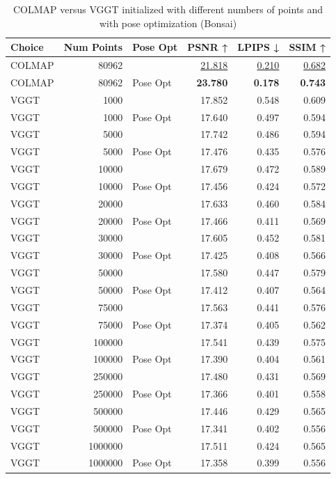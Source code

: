 \begin{table}[H]
\caption{COLMAP versus VGGT initialized with different numbers of points and with pose optimization (Bonsai)}
\label{tab:02_num_points_pose_opt_bonsai}
\begin{tabular}{lrlrrr}
\toprule
Choice & Num Points & Pose Opt & PSNR ↑ & LPIPS ↓ & SSIM ↑ \\
\midrule
COLMAP & 80962 &  & \underline{21.818} & \underline{0.210} & \underline{0.682} \\
COLMAP & 80962 & Pose Opt & \textbf{23.780} & \textbf{0.178} & \textbf{0.743} \\
VGGT & 1000 &  & 17.852 & 0.548 & 0.609 \\
VGGT & 1000 & Pose Opt & 17.640 & 0.497 & 0.594 \\
VGGT & 5000 &  & 17.742 & 0.486 & 0.594 \\
VGGT & 5000 & Pose Opt & 17.476 & 0.435 & 0.576 \\
VGGT & 10000 &  & 17.679 & 0.472 & 0.589 \\
VGGT & 10000 & Pose Opt & 17.456 & 0.424 & 0.572 \\
VGGT & 20000 &  & 17.633 & 0.460 & 0.584 \\
VGGT & 20000 & Pose Opt & 17.466 & 0.411 & 0.569 \\
VGGT & 30000 &  & 17.605 & 0.452 & 0.581 \\
VGGT & 30000 & Pose Opt & 17.425 & 0.408 & 0.566 \\
VGGT & 50000 &  & 17.580 & 0.447 & 0.579 \\
VGGT & 50000 & Pose Opt & 17.412 & 0.407 & 0.564 \\
VGGT & 75000 &  & 17.563 & 0.441 & 0.576 \\
VGGT & 75000 & Pose Opt & 17.374 & 0.405 & 0.562 \\
VGGT & 100000 &  & 17.541 & 0.439 & 0.575 \\
VGGT & 100000 & Pose Opt & 17.390 & 0.404 & 0.561 \\
VGGT & 250000 &  & 17.480 & 0.431 & 0.569 \\
VGGT & 250000 & Pose Opt & 17.366 & 0.401 & 0.558 \\
VGGT & 500000 &  & 17.446 & 0.429 & 0.565 \\
VGGT & 500000 & Pose Opt & 17.341 & 0.402 & 0.556 \\
VGGT & 1000000 &  & 17.511 & 0.424 & 0.565 \\
VGGT & 1000000 & Pose Opt & 17.358 & 0.399 & 0.556 \\
\bottomrule
\end{tabular}
\end{table}
